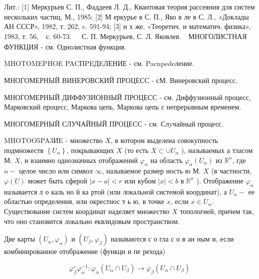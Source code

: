 \documentclass[10pt]{article}
\begin{document}
Лит.: [1] Меркурьев С. П., Фаддеев Л. Д., Квантовая теория рассеяния для систем нескольких частиц, М., 1985; [2] М еркурье в С. П., Яко в ле в С. Л., «Доклады АН СССР», 1982, т. 262, c. 591-94; [3] и х же, «Теоретич. и математич. физика», 1983, т. 56, $\begin{array}{ll}\text { с. 60-73. } & \text { С. П. Меркурьев, С. Л. Яковлев. }\end{array}$ МНОГОЛИСТНАЯ ФУНКЦИЯ - см. Однолистная функция.



MHOTOMEPHOE PACПPEДEЛЕНИЕ - см. Pacnpedeление.



МНОГОМЕРНЫЙ ВИНЕРОВСКИЙ ПРОЦЕСС - сМ. Винеровский процесс.



МНОГОМЕРНЫЙ ДИФФУЗИОННЫЙ ПРОЦЕСС - см. Диффузионный процесс, Марковский процесс, Маркова цепь, Маркова цепь с непрерывным временем.



МНОГОМЕРНЫЙ СЛУЧАЙНЫЙ ПРОЦЕСС - см. Слyчайный процесс.



MHOTOO5PA3ИE - множество $X$, в котором выделена совокупность подмножеств $\left\{U_{\alpha}\right\}$, покрывающих $X$ (то есть $X \subset \cup U_{\alpha}$ ), называемых а тласом М. $X$, и взаимно однозначных отображений $\varphi_{\alpha}$ на область $\varphi_{\alpha}\left(U_{\alpha}\right)$ из $\mathbb{R}^{n}$, где $n-$ целое число или символ $\infty$, называемое размер ность ю М. $X$ (в частности, $\varphi(U)$ может быть сферой $|x-a|<r$ или кубом $|x|<b$ в $\mathbb{R}^{n}$ ). Отображение $\varphi_{\alpha}$ называется л о каль но й ка ртой (или локальной системой координат), а $U_{\alpha}-$ ее областью определения, или окрестнос т ь ю, в точке $x$, если $x \in U_{\alpha}$. Существование систем координат наделяет множество $X$ топологией, причем так, что оно становится локально еквлидовым пространством.



Две карты $\left(U_{\alpha}, \varphi_{\alpha}\right)$ и $\left(U_{\beta}, \varphi_{\beta}\right)$ называются с о гла с о в ан ным и, если комбинированное отображение (функци и пе рехода)



\[

\varphi_{\beta}^{\circ} \varphi_{\alpha}^{-1}: \varphi_{\alpha}\left(U_{\alpha} \cap U_{\beta}\right) \rightarrow \varphi_{\beta}\left(U_{\alpha} \cap U_{\beta}\right)

\]
\end{document}
